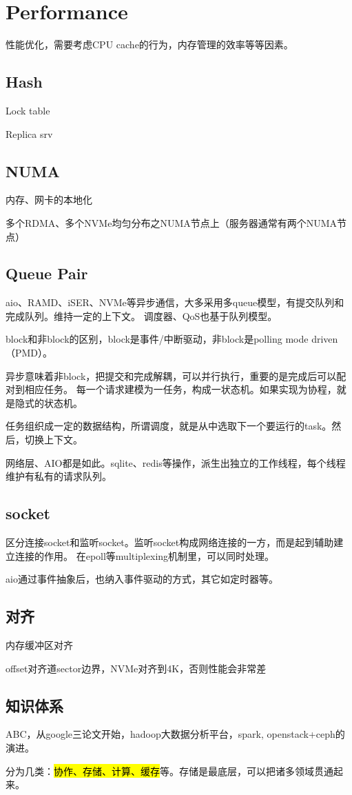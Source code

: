 \section{Performance}

性能优化，需要考虑CPU cache的行为，内存管理的效率等等因素。

\subsection{Hash}

\begin{enumbox}
\item Lock table
\item Replica srv
\end{enumbox}

\subsection{NUMA}

内存、网卡的本地化

多个RDMA、多个NVMe均匀分布之NUMA节点上（服务器通常有两个NUMA节点）

\subsection{Queue Pair}

aio、RAMD、iSER、NVMe等异步通信，大多采用多queue模型，有提交队列和完成队列。维持一定的上下文。
调度器、QoS也基于队列模型。

block和非block的区别，block是事件/中断驱动，非block是polling mode driven（PMD）。

异步意味着非block，把提交和完成解耦，可以并行执行，重要的是完成后可以配对到相应任务。
每一个请求建模为一任务，构成一状态机。如果实现为协程，就是隐式的状态机。

任务组织成一定的数据结构，所谓调度，就是从中选取下一个要运行的task。然后，切换上下文。

网络层、AIO都是如此。sqlite、redis等操作，派生出独立的工作线程，每个线程维护有私有的请求队列。

\subsection{socket}

区分连接socket和监听socket。监听socket构成网络连接的一方，而是起到辅助建立连接的作用。
在epoll等multiplexing机制里，可以同时处理。

aio通过事件抽象后，也纳入事件驱动的方式，其它如定时器等。

\subsection{对齐}

内存缓冲区对齐

offset对齐道sector边界，NVMe对齐到4K，否则性能会非常差

\subsection{知识体系}

ABC，从google三论文开始，hadoop大数据分析平台，spark, openstack+ceph的演进。

分为几类：\hl{协作、存储、计算、缓存}等。存储是最底层，可以把诸多领域贯通起来。
